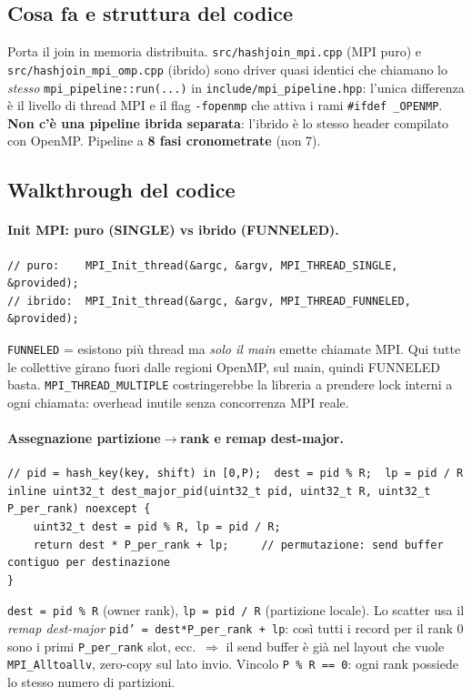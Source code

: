 \documentclass[11pt,a4paper]{article}
\begin{document}
\subsection{Cosa fa e struttura del codice}

Porta il join in memoria distribuita. \texttt{src/hashjoin\_mpi.cpp} (MPI puro) e \texttt{src/hashjoin\_mpi\_omp.cpp} (ibrido) sono driver quasi identici che chiamano lo \emph{stesso} \texttt{mpi\_pipeline::run(...)} in \texttt{include/mpi\_pipeline.hpp}: l'unica differenza è il livello di thread MPI e il flag \texttt{-fopenmp} che attiva i rami \texttt{\#ifdef \_OPENMP}. \textbf{Non c'è una pipeline ibrida separata}: l'ibrido è lo stesso header compilato con OpenMP. Pipeline a \textbf{8 fasi cronometrate} (non 7).

\subsection{Walkthrough del codice}

\paragraph{Init MPI: puro (SINGLE) vs ibrido (FUNNELED).}
\begin{lstlisting}[style=cpp]
// puro:    MPI_Init_thread(&argc, &argv, MPI_THREAD_SINGLE,   &provided);
// ibrido:  MPI_Init_thread(&argc, &argv, MPI_THREAD_FUNNELED, &provided);
\end{lstlisting}
\begin{whybox}
\texttt{FUNNELED} = esistono più thread ma \emph{solo il main} emette chiamate MPI. Qui tutte le collettive girano fuori dalle regioni OpenMP, sul main, quindi FUNNELED basta. \texttt{MPI\_THREAD\_MULTIPLE} costringerebbe la libreria a prendere lock interni a ogni chiamata: overhead inutile senza concorrenza MPI reale.
\end{whybox}

\paragraph{Assegnazione partizione$\to$rank e remap dest-major.}
\begin{lstlisting}[style=cpp]
// pid = hash_key(key, shift) in [0,P);  dest = pid % R;  lp = pid / R
inline uint32_t dest_major_pid(uint32_t pid, uint32_t R, uint32_t P_per_rank) noexcept {
    uint32_t dest = pid % R, lp = pid / R;
    return dest * P_per_rank + lp;     // permutazione: send buffer contiguo per destinazione
}
\end{lstlisting}
\begin{whybox}
\texttt{dest = pid \% R} (owner rank), \texttt{lp = pid / R} (partizione locale). Lo scatter usa il \emph{remap dest-major} \texttt{pid' = dest*P\_per\_rank + lp}: così tutti i record per il rank 0 sono i primi \texttt{P\_per\_rank} slot, ecc.\ $\Rightarrow$ il send buffer è già nel layout che vuole \texttt{MPI\_Alltoallv}, zero-copy sul lato invio. Vincolo \texttt{P \% R == 0}: ogni rank possiede lo stesso numero di partizioni.
\end{whybox}
\end{document}
